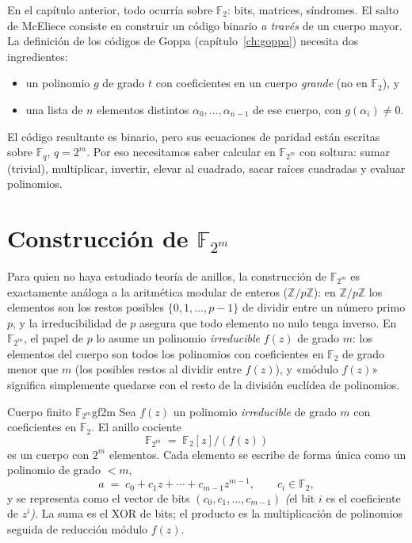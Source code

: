 \documentclass[11pt,a4paper,oneside]{report}
\newcommand{\F}{\mathbb{F}}
\newcommand{\GF}[1]{\mathbb{F}_{#1}}
\begin{document}
En el capítulo anterior, todo ocurría sobre $\F_2$: bits, matrices, síndromes.
El salto de McEliece consiste en construir un código binario \emph{a través}
de un cuerpo mayor. La definición de los códigos de Goppa
(capítulo~\ref{ch:goppa}) necesita dos ingredientes:

\begin{itemize}[leftmargin=1.4em,itemsep=2pt]
  \item un polinomio $g$ de grado $t$ con coeficientes en un cuerpo
        \emph{grande} (no en $\F_2$), y
  \item una lista de $n$ elementos distintos $\alpha_0,\dots,\alpha_{n-1}$
        de ese cuerpo, con $g(\alpha_i)\neq 0$.
\end{itemize}
El código resultante es binario, pero sus ecuaciones de paridad están
escritas sobre $\GF{q}$, $q=2^m$. Por eso necesitamos saber calcular en
$\GF{2^m}$ con soltura: sumar (trivial), multiplicar, invertir, elevar al
cuadrado, sacar raíces cuadradas y evaluar polinomios.

\section{Construcción de $\GF{2^m}$}

\begin{idea}
Para quien no haya estudiado teoría de anillos, la construcción de $\GF{2^m}$ es
exactamente análoga a la aritmética modular de enteros ($\mathbb{Z}/p\mathbb{Z}$):
en $\mathbb{Z}/p\mathbb{Z}$ los elementos son los restos posibles
$\{0,1,\dots,p-1\}$ de dividir entre un número primo $p$, y la irreducibilidad de
$p$ asegura que todo elemento no nulo tenga inverso. En $\GF{2^m}$, el papel de
$p$ lo asume un polinomio \emph{irreducible} $f(z)$ de grado $m$: los elementos
del cuerpo son todos los polinomios con coeficientes en $\F_2$ de grado menor que
$m$ (los posibles restos al dividir entre $f(z)$), y «módulo $f(z)$» significa
simplemente quedarse con el resto de la división euclídea de polinomios.
\end{idea}

\begin{definicion}{Cuerpo finito $\GF{2^m}$}{gf2m}
Sea $f(z)$ un polinomio \emph{irreducible} de grado $m$ con coeficientes en
$\F_2$. El anillo cociente
\[
\GF{2^m} \;=\; \F_2[z]/(f(z))
\]
es un cuerpo con $2^m$ elementos. Cada elemento se escribe de forma única
como un polinomio de grado $<m$,
\[
a \;=\; c_0 + c_1 z + \cdots + c_{m-1}z^{m-1},\qquad c_i\in\F_2,
\]
y se representa como el vector de bits $(c_0,c_1,\dots,c_{m-1})$
\emph{(}el bit $i$ es el coeficiente de $z^i$\emph{)}. La suma es el XOR
de bits; el producto es la multiplicación de polinomios seguida de
reducción módulo $f(z)$.
\end{definicion}
\end{document}
